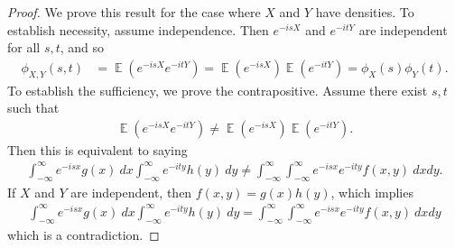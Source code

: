 \documentclass[12pt]{article}
\DeclareMathOperator{\ex}{\mathbb{E}}
\theoremstyle{plain}
\theoremstyle{definition}
\theoremstyle{remark}
\numberwithin{equation}{section}  %
\begin{document}
\begin{proof}
	We prove this result for the case where $X$ and $Y$ have densities.
	To establish necessity, assume independence. Then
	$e^{-isX}$ and $e^{-itY}$ are independent for all $s, t$, and so
	\begin{equation*}
		\begin{split}
			\phi_{X,Y}(s,t) & = \ex(e^{-isX} e^{-itY}) = \ex(e^{-isX}) \ex(e^{-itY})
			= \phi_{X}(s) \phi_{Y}(t).
		\end{split}
	\end{equation*}
To establish the sufficiency, we prove the contrapositive. Assume there exist $s, t$ such that
\begin{equation*}
\begin{split}
\ex(e^{-isX} e^{-itY}) \neq \ex(e^{-isX}) \ex(e^{-itY}).
\end{split}
\end{equation*}
Then this is equivalent to saying
\begin{equation*}
\begin{split}
	\int_{-\infty}^{\infty} e^{-isx} g(x) \ dx \int_{-\infty}^{\infty}
	e^{-ity} h(y) \ dy
	\neq 
\int_{-\infty}^{\infty}\int_{-\infty}^{\infty} e^{-isx} e^{-ity} f(x, y) \ dx
dy.
\end{split}
\end{equation*}
If $X$ and $Y$ are independent, then $f(x, y) = g(x) h(y)$, which implies
\begin{equation*}
\begin{split}
	\int_{-\infty}^{\infty} e^{-isx} g(x) \ dx \int_{-\infty}^{\infty}
	e^{-ity} h(y) \ dy
	= 
\int_{-\infty}^{\infty}\int_{-\infty}^{\infty} e^{-isx} e^{-ity} f(x, y) \ dx dy
\end{split}
\end{equation*}
which is a contradiction.
\end{proof}
\end{document}
